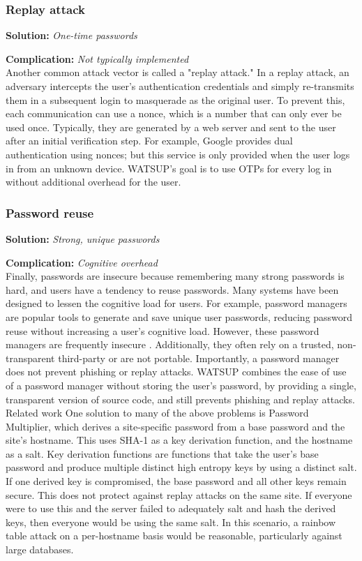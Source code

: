 \subsubsection{Replay attack}

\textbf{Solution:} \emph{One-time passwords}

\noindent\textbf{Complication:} \emph{Not typically implemented}\\

Another common attack vector is called a "replay attack." In a replay attack, an adversary intercepts the user's authentication credentials and simply re-transmits them in a subsequent login to masquerade as the original user. To prevent this, each communication can use a nonce, which is a number that can only ever be used once. Typically, they are generated by a web server and sent to the user after an initial verification step. For example, Google provides dual authentication using nonces; but this service is only provided when the user logs in from an unknown device. WATSUP's goal is to use OTPs for every log in without additional overhead for the user.


\subsubsection{Password reuse}

\textbf{Solution:} \emph{Strong, unique passwords}

\noindent\textbf{Complication:} \emph{Cognitive overhead}\\

Finally, passwords are insecure because remembering many strong passwords is hard, and users have a tendency to reuse passwords. Many systems have been designed to lessen the cognitive load for users. For example, password managers are popular tools to generate and save unique user passwords, reducing password reuse without increasing a user's cognitive load. However, these password managers are frequently insecure \cite{Li:2014}. Additionally, they often rely on a trusted, non-transparent third-party or are not portable. Importantly, a password manager does not prevent phishing or replay attacks. WATSUP combines the ease of use of a password manager without storing the user's password, by providing a single, transparent version of source code, and still prevents phishing and replay attacks.
Related work
One solution to many of the above problems is Password Multiplier, which derives a site-specific password from a base password and the site's hostname. This uses SHA-1 as a key derivation function, and the hostname as a salt. Key derivation functions are functions that take the user's base password and produce multiple distinct high entropy keys by using a distinct salt. If one derived key is compromised, the base password and all other keys remain secure.\cite{Halderman:2005} This does not protect against replay attacks on the same site. If everyone were to use this and the server failed to adequately salt and hash the derived keys, then everyone would be using the same salt. In this scenario, a rainbow table attack on a per-hostname basis would be reasonable, particularly against large databases.

